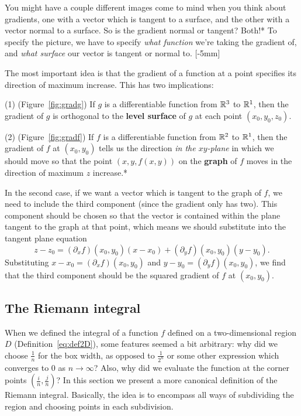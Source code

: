 \documentclass[prettycode,shellescape]{watsonbook}
\begin{document}
You might have a couple different images come to mind when you think
about gradients, one with a vector which is tangent to a surface, and
the other with a vector normal to a surface. So is the gradient normal
or tangent? Both!* To specify the picture, we have to specify
\textit{what function} we're taking the gradient of, and \textit{what
  surface} our vector is tangent or normal to.  [-5mm]

The most important idea is that the gradient of a function at a point
specifies its direction of maximum increase. This has two
implications:

(1) (Figure~\ref{fig:gradg}) If $g$ is a differentiable function from $\mathbb{R}^3$
to $\mathbb{R}^1$, then the gradient of $g$ is orthogonal to the \textbf{level
  surface} of $g$ at each point $(x_0,y_0,z_0)$.

(2) (Figure~\ref{fig:gradf}) If $f$ is a differentiable function from
$\mathbb{R}^2$ to $\mathbb{R}^1$, then the gradient of $f$ at $(x_0,y_0)$ tells us the
direction \textit{in the $xy$-plane} in which we should move so that
the point $(x,y,f(x,y))$ on the \textbf{graph} of $f$ moves in the
direction of maximum $z$ increase.* 

In the second case, if we want a vector which is tangent to the graph
of $f$, we need to include the third component (since the gradient
only has two). This component should be chosen so that the vector is
contained within the plane tangent to the graph at that point, which
means we should substitute into the tangent plane equation
\[
  z - z_0 = (\partial_x f)(x_0,y_0)(x-x_0) +  (\partial_y
  f)(x_0,y_0)(y-y_0). 
\]
Substituting $x-x_0 = (\partial_x f)(x_0,y_0)$ and $y-y_0 =
(\partial_y f)(x_0,y_0)$, we find that the third component should be
the squared gradient of $f$ at $(x_0,y_0)$.

\newpage

\subsection{The Riemann integral} \label{sec:riemannintegral} 

When we defined the integral of a function $f$ defined on a
two-dimensional region $D$ (Definition~\ref{eq:def2D}), some features
seemed a bit arbitrary: why did we choose $\tfrac1n$ for the box
width, as opposed to $\tfrac1{2^n}$ or some other expression which
converges to 0 as $n\to\infty$? Also, why did we evaluate the function
at the corner points $\left(\tfrac in, \tfrac jn\right)$? In this
section we present a more canonical definition of the Riemann
integral. Basically, the idea is to encompass all ways of subdividing
the region and choosing points in each subdivision.
\end{document}

